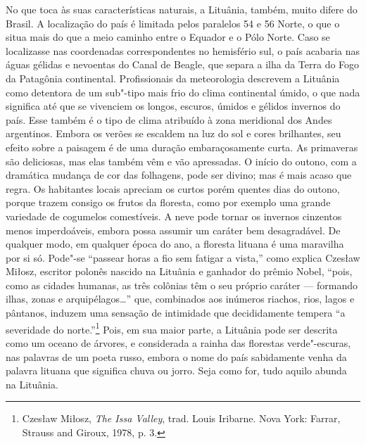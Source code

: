 {No que toca às suas características naturais, a Lituânia, também, muito
difere do Brasil. A localização do país é limitada pelos paralelos 54 e
56 Norte, o que o situa mais do que a meio caminho entre o Equador e o
Pólo Norte. Caso se localizasse nas coordenadas correspondentes no
hemisfério sul, o país acabaria nas águas gélidas e nevoentas do Canal
de Beagle, que separa a ilha da Terra do Fogo da Patagônia continental.
Profissionais da meteorologia descrevem a Lituânia como detentora de um
sub"-tipo mais frio do clima continental úmido, o que nada significa até
que se vivenciem os longos, escuros, úmidos e gélidos invernos do país.
Esse também é o tipo de clima atribuído à zona meridional dos Andes
argentinos. Embora os verões se escaldem na luz do sol e cores
brilhantes, seu efeito sobre a paisagem é de uma duração embaraçosamente
curta. As primaveras são deliciosas, mas elas também vêm e vão
apressadas. O início do outono, com a dramática mudança de cor das
folhagens, pode ser divino; mas é mais acaso que regra. Os habitantes
locais apreciam os curtos porém quentes dias do outono, porque trazem
consigo os frutos da floresta, como por exemplo uma grande variedade de
cogumelos comestíveis. A neve pode tornar os invernos cinzentos menos
imperdoáveis, embora possa assumir um caráter bem desagradável. De
qualquer modo, em qualquer época do ano, a floresta lituana é uma
maravilha por si só. Pode"-se ``passear horas a fio sem fatigar a
vista,'' como explica Czesław Miłosz, escritor polonês nascido na
Lituânia e ganhador do prêmio Nobel, ``pois, como as cidades humanas, as
três colônias têm o seu próprio caráter --- formando ilhas, zonas e
arquipélagos\ldots{}'' que, combinados aos inúmeros riachos, rios, lagos
e pântanos, induzem uma sensação de intimidade que decididamente tempera
``a severidade do norte.''\footnote{Czesław Miłosz, \textit{The Issa
  Valley}, trad. Louis Iribarne. Nova York: Farrar, Strauss and
  Giroux, 1978, p. 3.} Pois, em sua maior parte, a Lituânia pode ser
descrita como um oceano de árvores, e considerada a rainha das florestas
verde"-escuras, nas palavras de um poeta russo, embora o nome do país
sabidamente venha da palavra lituana que significa chuva ou jorro. Seja
como for, tudo aquilo abunda na Lituânia.

}
